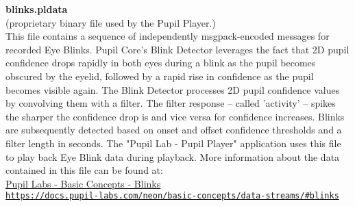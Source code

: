 \begin{description}
\begin{addmargin}[0em]{0em}
    \begin{addmargin}[1em]{0em} %
        \label{blinks.pldata}
        \textbf{blinks.pldata}\\(proprietary binary file used by the Pupil Player.)\\
        This file contains a sequence of independently msgpack-encoded messages for recorded Eye Blinks.
        Pupil Core's Blink Detector leverages the fact that 2D pupil confidence drops rapidly in both eyes
        during a blink as the pupil becomes obscured by the eyelid, followed by a rapid rise in confidence as the pupil becomes visible again.
        The Blink Detector processes 2D pupil confidence values by convolving them with a filter.
        The filter response – called 'activity' – spikes the sharper the confidence drop is and vice versa for confidence increases.
        Blinks are subsequently detected based on onset and offset confidence thresholds and a filter length in seconds.
        The "Pupil Lab - Pupil Player" application uses this file to play back Eye Blink data during playback.
        More information about the data contained in this file can be found at:\\
        \href{https://docs.pupil-labs.com/neon/basic-concepts/data-streams/#blinks}
        {{Pupil Labs - Basic Concepts - Blinks}\\\nolinkurl{https://docs.pupil-labs.com/neon/basic-concepts/data-streams/\#blinks}}
    \end{addmargin} %


\end{addmargin}
\end{description}
